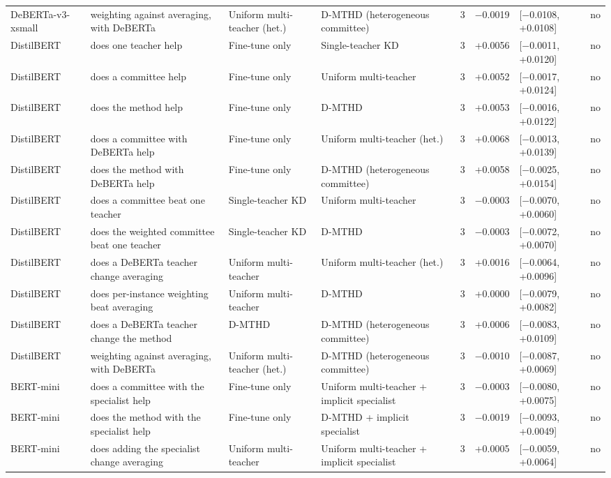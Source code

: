 {\begin{longtable}{p{1.5cm}p{2.9cm}p{2.5cm}p{2.6cm}cp{1.0cm}p{1.8cm}c}
DeBERTa-v3-xsmall & weighting against averaging, with DeBERTa & Uniform multi-teacher (het.) & D-MTHD (heterogeneous committee) & 3 & $-$0.0019 & [$-$0.0108, +0.0108] & no \\
DistilBERT & does one teacher help & Fine-tune only & Single-teacher KD & 3 & +0.0056 & [$-$0.0011, +0.0120] & no \\
DistilBERT & does a committee help & Fine-tune only & Uniform multi-teacher & 3 & +0.0052 & [$-$0.0017, +0.0124] & no \\
DistilBERT & does the method help & Fine-tune only & D-MTHD & 3 & +0.0053 & [$-$0.0016, +0.0122] & no \\
DistilBERT & does a committee with DeBERTa help & Fine-tune only & Uniform multi-teacher (het.) & 3 & +0.0068 & [$-$0.0013, +0.0139] & no \\
DistilBERT & does the method with DeBERTa help & Fine-tune only & D-MTHD (heterogeneous committee) & 3 & +0.0058 & [$-$0.0025, +0.0154] & no \\
DistilBERT & does a committee beat one teacher & Single-teacher KD & Uniform multi-teacher & 3 & $-$0.0003 & [$-$0.0070, +0.0060] & no \\
DistilBERT & does the weighted committee beat one teacher & Single-teacher KD & D-MTHD & 3 & $-$0.0003 & [$-$0.0072, +0.0070] & no \\
DistilBERT & does a DeBERTa teacher change averaging & Uniform multi-teacher & Uniform multi-teacher (het.) & 3 & +0.0016 & [$-$0.0064, +0.0096] & no \\
DistilBERT & does per-instance weighting beat averaging & Uniform multi-teacher & D-MTHD & 3 & +0.0000 & [$-$0.0079, +0.0082] & no \\
DistilBERT & does a DeBERTa teacher change the method & D-MTHD & D-MTHD (heterogeneous committee) & 3 & +0.0006 & [$-$0.0083, +0.0109] & no \\
DistilBERT & weighting against averaging, with DeBERTa & Uniform multi-teacher (het.) & D-MTHD (heterogeneous committee) & 3 & $-$0.0010 & [$-$0.0087, +0.0069] & no \\
BERT-mini & does a committee with the specialist help & Fine-tune only & Uniform multi-teacher + implicit specialist & 3 & $-$0.0003 & [$-$0.0080, +0.0075] & no \\
BERT-mini & does the method with the specialist help & Fine-tune only & D-MTHD + implicit specialist & 3 & $-$0.0019 & [$-$0.0093, +0.0049] & no \\
BERT-mini & does adding the specialist change averaging & Uniform multi-teacher & Uniform multi-teacher + implicit specialist & 3 & +0.0005 & [$-$0.0059, +0.0064] & no \\

\end{longtable}}
